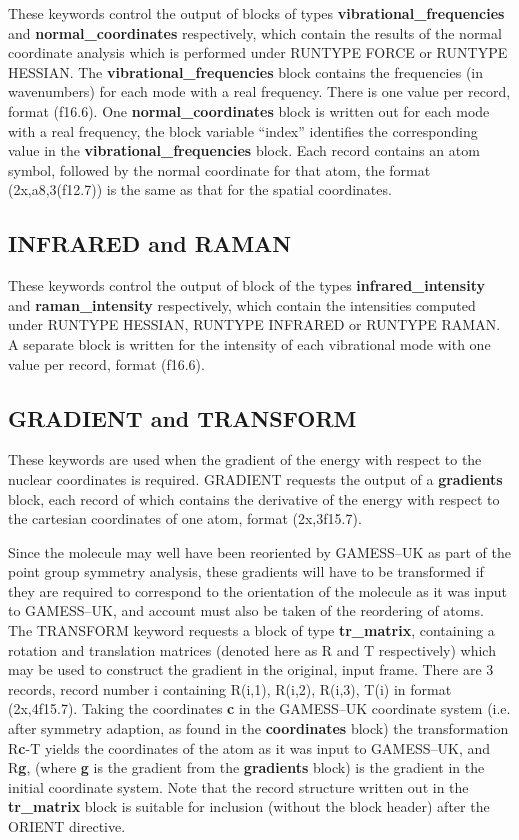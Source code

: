 \documentclass[11pt,fleqn]{article}
\begin{document}
These keywords control the output of blocks of types {\bf vibrational\_frequencies}
and {\bf normal\_coordinates} respectively, which contain the results
of the normal coordinate analysis which is performed under
RUNTYPE FORCE or RUNTYPE HESSIAN.  The {\bf vibrational\_frequencies} block
contains the frequencies (in wavenumbers) for each mode with a real frequency.
There is one value per record, format (f16.6). One {\bf normal\_coordinates} block
is written out for each mode with a real frequency, the block variable ``index'' identifies
the corresponding value in the {\bf vibrational\_frequencies} block. Each record contains an
atom symbol, followed by the normal coordinate for that atom, the format (2x,a8,3(f12.7)) 
is the same as that for the spatial coordinates.

\subsection[INFRARED and RAMAN]{INFRARED and RAMAN}

These keywords control the output of block of the types
{\bf infrared\_intensity} and {\bf raman\_intensity} respectively, which 
contain the intensities computed under RUNTYPE HESSIAN, RUNTYPE INFRARED or
RUNTYPE RAMAN. A separate block is written for the intensity of each vibrational
mode with one value per record, format (f16.6).

\subsection[GRADIENT and TRANSFORM]{GRADIENT and TRANSFORM}

These keywords are used when the gradient of the 
energy with respect to the nuclear coordinates is required. GRADIENT requests the 
output of a {\bf gradients} block, each record of which contains the derivative of the
energy with respect to the cartesian coordinates of one atom, format (2x,3f15.7).

Since the molecule may well have been reoriented by GAMESS--UK as part of the point group 
symmetry analysis, these gradients will have to be transformed if they are required to
correspond to the orientation of the molecule as it was input to GAMESS--UK, and account must
also be taken of the reordering of atoms.
The TRANSFORM keyword requests a block of type {\bf tr\_matrix}, containing a rotation and translation
matrices (denoted here as R and T respectively) which may be used to construct the gradient in the
original, input frame.
There are 3 records, record number i containing R(i,1), R(i,2), R(i,3), T(i) in format (2x,4f15.7).
Taking the coordinates {\bf c} in the GAMESS--UK coordinate system (i.e. after symmetry adaption, as found in the
{\bf coordinates} block)
the transformation R{\bf c}-T yields the coordinates of the atom as it was input to GAMESS--UK, and R{\bf g}, 
(where {\bf g} is the gradient from the {\bf gradients} block) is the gradient in the initial coordinate
system. 
Note that the record structure written out in the {\bf tr\_matrix } block is suitable
for inclusion (without the block header) after the ORIENT directive.
\end{document}

